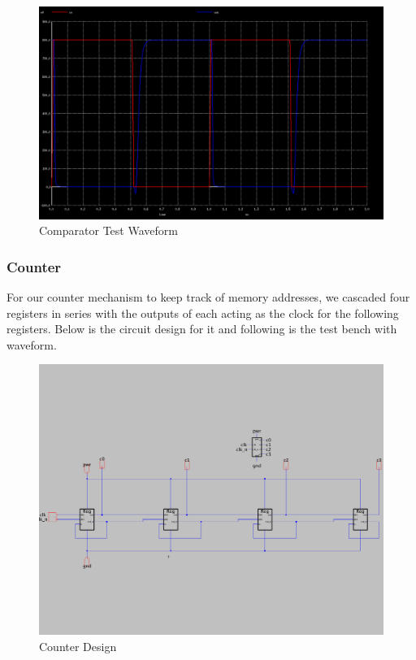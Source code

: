 \documentclass[a4paper]{article}
\begin{document}
\begin{figure}[H]
	\centering
	\includegraphics[scale=0.26]{comparatorWaveform}
	\caption{Comparator Test Waveform}
	\label{fig:comparatorWaveform}
\end{figure}

\subsubsection{Counter}
\label{sec:counter_design}

For our counter mechanism to keep track of memory addresses, we cascaded four registers in series with the outputs of each acting as the clock for the following registers. Below is the circuit design for it and following is the test bench with waveform.

\begin{figure}[H]
	\centering
	\includegraphics[scale=0.26]{counter}
	\caption{Counter Design}
	\label{fig:counter}
\end{figure}
\end{document}

